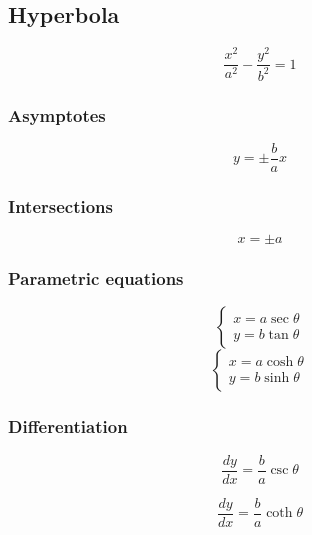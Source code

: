 \documentclass[a4paper,9pt]{scrartcl}
\begin{document}
    \subsection{Hyperbola}

    \begin{displaymath}
        \frac{x^2}{a^2} - \frac{y^2}{b^2} = 1
    \end{displaymath}

    \subsubsection{Asymptotes}
    \begin{displaymath}
        y = \pm\frac{b}{a}x
    \end{displaymath}

    \subsubsection{Intersections}
    \begin{displaymath}
        x = {\pm}a
    \end{displaymath}

    \subsubsection{Parametric equations}
    \begin{displaymath}
        \left\{
        \begin{array}{c}
            x = a\sec\theta \\
            y = b\tan\theta
        \end{array}
    \end{displaymath}
    \begin{displaymath}
        \left\{
        \begin{array}{c}
            x = a\cosh\theta \\
            y = b\sinh\theta
        \end{array}
    \end{displaymath}

    \subsubsection{Differentiation}
    \begin{displaymath}
        \frac{dy}{dx} = \frac{b}{a}\csc\theta
    \end{displaymath}

    \begin{displaymath}
        \frac{dy}{dx} = \frac{b}{a}\coth\theta
    \end{displaymath}
\end{document}
